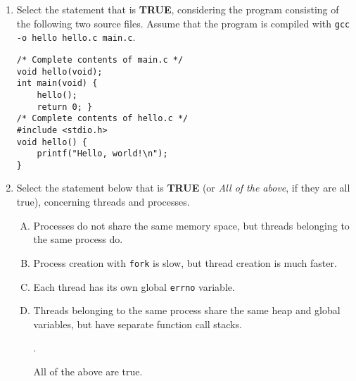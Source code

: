 \documentclass[11pt]{article}
\begin{document}
\begin{enumerate}[{1}.1]
	\newpage
	\item Select the statement that is \textbf{TRUE}, considering the program consisting of the following two
	source files. Assume that the program is compiled with \Verb|gcc -o hello hello.c main.c|.
		\begin{Verbatim}
/* Complete contents of main.c */
void hello(void);
int main(void) {
	hello();
	return 0; }
/* Complete contents of hello.c */
#include <stdio.h>
void hello() {
	printf("Hello, world!\n");
}
		\end{Verbatim}

	\item Select the statement below that is \textbf{TRUE} (or \textit{All of the above}, if they are all true), concerning threads and processes.
		\begin{enumerate}[A.]
			\item Processes do not share the same memory space, but threads belonging to the same process do.
			\item Process creation with \Verb|fork| is slow, but thread creation is much faster.
			\item Each thread has its own global \Verb|errno| variable.
			\item Threads belonging to the same process share the same heap and global variables, but have separate function call stacks.
			\item[\textcolor{correct}{\addtocounter{enumii}{1}\Alph{enumii}.}] \textcolor{correct}{All of the above are true.}
		\end{enumerate}


\end{enumerate}
\end{document}
